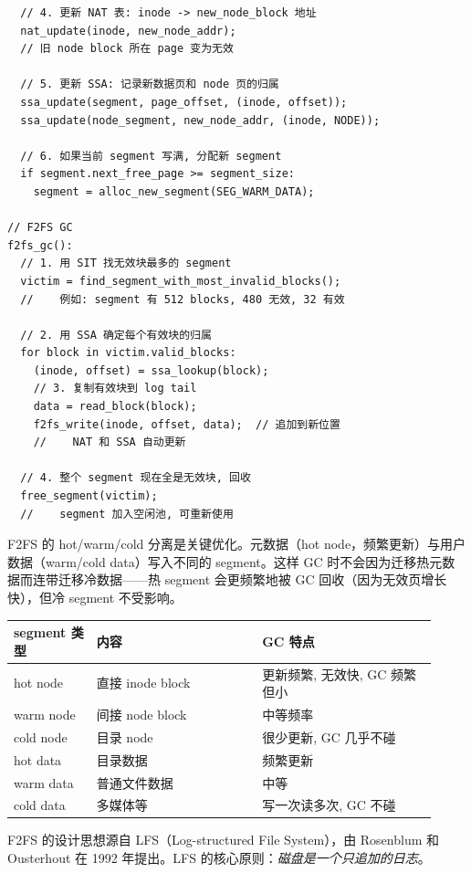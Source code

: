 \begin{filesystemlayout}
\begin{lstlisting}
  // 4. 更新 NAT 表: inode -> new_node_block 地址
  nat_update(inode, new_node_addr);
  // 旧 node block 所在 page 变为无效

  // 5. 更新 SSA: 记录新数据页和 node 页的归属
  ssa_update(segment, page_offset, (inode, offset));
  ssa_update(node_segment, new_node_addr, (inode, NODE));

  // 6. 如果当前 segment 写满, 分配新 segment
  if segment.next_free_page >= segment_size:
    segment = alloc_new_segment(SEG_WARM_DATA);

// F2FS GC
f2fs_gc():
  // 1. 用 SIT 找无效块最多的 segment
  victim = find_segment_with_most_invalid_blocks();
  //    例如: segment 有 512 blocks, 480 无效, 32 有效

  // 2. 用 SSA 确定每个有效块的归属
  for block in victim.valid_blocks:
    (inode, offset) = ssa_lookup(block);
    // 3. 复制有效块到 log tail
    data = read_block(block);
    f2fs_write(inode, offset, data);  // 追加到新位置
    //    NAT 和 SSA 自动更新

  // 4. 整个 segment 现在全是无效块, 回收
  free_segment(victim);
  //    segment 加入空闲池, 可重新使用
\end{lstlisting}

F2FS 的 hot/warm/cold 分离是关键优化。元数据（hot node，频繁更新）与用户数据（warm/cold data）写入不同的 segment。这样 GC 时不会因为迁移热元数据而连带迁移冷数据——热 segment 会更频繁地被 GC 回收（因为无效页增长快），但冷 segment 不受影响。

\begin{longtable}{|F{0.18\linewidth}|F{0.36\linewidth}|F{0.38\linewidth}|}
\toprule
{}
segment 类型 & 内容 & GC 特点 \\
\midrule
hot node & 直接 inode block & 更新频繁, 无效快, GC 频繁但小 \\\tablerowrule
warm node & 间接 node block & 中等频率 \\\tablerowrule
cold node & 目录 node & 很少更新, GC 几乎不碰 \\\tablerowrule
hot data & 目录数据 & 频繁更新 \\\tablerowrule
warm data & 普通文件数据 & 中等 \\\tablerowrule
cold data & 多媒体等 & 写一次读多次, GC 不碰 \\
\bottomrule
\end{longtable}


F2FS 的设计思想源自 LFS（Log-structured File System），由 Rosenblum 和 Ousterhout 在 1992 年提出。LFS 的核心原则：\emph{磁盘是一个只追加的日志}。


\end{filesystemlayout}
